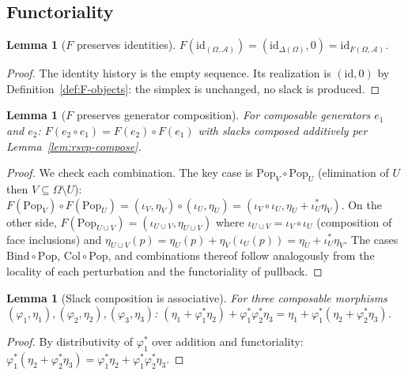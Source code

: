 \documentclass[12pt,a4paper]{article}
\newtheorem{lemma}[theorem]{Lemma}
\theoremstyle{definition}
\theoremstyle{remark}
\providecommand{\id}{\mathrm{id}}
\renewcommand{\id}{\mathrm{id}}
\newcommand{\Pop}{\ensuremath{\mathrm{Pop}}}
\newcommand{\Bind}{\ensuremath{\mathrm{Bind}}}
\newcommand{\Col}{\ensuremath{\mathrm{Col}}}
\begin{document}
\subsection{Functoriality}

\begin{lemma}[$F$ preserves identities]
\label{lem:F-id}
$F(\id_{(\Omega,\mathcal{A})})=(\id_{\Delta(\Omega)},0)=\id_{F(\Omega,\mathcal{A})}$.
\end{lemma}

\begin{proof}
The identity history is the empty sequence. Its realization is $(\id,0)$ by
Definition~\ref{def:F-objects}: the simplex is unchanged, no slack is produced.
\end{proof}

\begin{lemma}[$F$ preserves generator composition]
\label{lem:F-comp}
For composable generators $e_1$ and $e_2$:
$F(e_2\circ e_1)=F(e_2)\circ F(e_1)$ with slacks composed additively per
Lemma~\ref{lem:rsvp-compose}.
\end{lemma}

\begin{proof}
We check each combination. The key case is $\Pop_V\circ\Pop_U$ (elimination of $U$
then $V\subseteq\Omega\setminus U$): $F(\Pop_V)\circ F(\Pop_U)=(\iota_V,\eta_V)\circ
(\iota_U,\eta_U)=(\iota_V\circ\iota_U,\eta_U+\iota_U^*\eta_V)$. On the other side,
$F(\Pop_{U\cup V})=(\iota_{U\cup V},\eta_{U\cup V})$ where $\iota_{U\cup V}=\iota_V
\circ\iota_U$ (composition of face inclusions) and $\eta_{U\cup V}(p)=\eta_U(p)+
\eta_V(\iota_U(p))=\eta_U+\iota_U^*\eta_V$. The cases $\Bind\circ\Pop$, $\Col\circ\Pop$,
and combinations thereof follow analogously from the locality of each perturbation
and the functoriality of pullback.
\end{proof}

\begin{lemma}[Slack composition is associative]
\label{lem:slack-assoc}
For three composable morphisms $(\varphi_1,\eta_1),(\varphi_2,\eta_2),(\varphi_3,\eta_3)$:
$(\eta_1+\varphi_1^*\eta_2)+\varphi_1^*\varphi_2^*\eta_3=
\eta_1+\varphi_1^*(\eta_2+\varphi_2^*\eta_3)$.
\end{lemma}

\begin{proof}
By distributivity of $\varphi_1^*$ over addition and functoriality:
$\varphi_1^*(\eta_2+\varphi_2^*\eta_3)=\varphi_1^*\eta_2+\varphi_1^*\varphi_2^*\eta_3$.
\end{proof}
\end{document}
